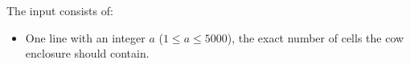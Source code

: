 
    The input consists of:
    \begin{itemize}
        \item One line with an integer $a$ ($1\leq a \leq 5000$), the exact number of cells the cow enclosure should contain.
    \end{itemize}
